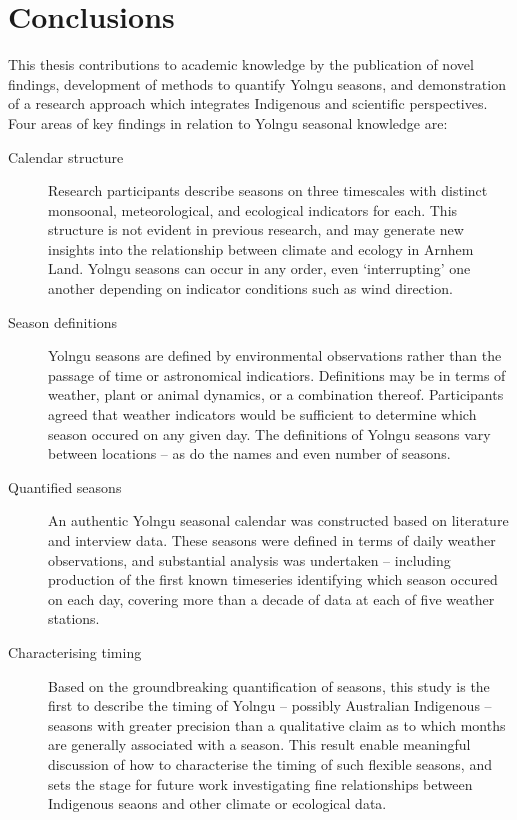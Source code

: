 \chapter{Conclusions}
\label{ch:conclusion}

This thesis contributions to academic knowledge by the publication of novel
findings, development of methods to quantify Yolngu seasons, and demonstration
of a research approach which integrates Indigenous and scientific perspectives.
%
Four areas of key findings in relation to Yolngu seasonal knowledge are:

\begin{description}
\item[Calendar structure]
    Research participants describe seasons on three timescales with distinct
    monsoonal, meteorological, and ecological indicators for each.  This
    structure is not evident in previous research, and may generate new
    insights into the relationship between climate and ecology in Arnhem Land.
    Yolngu seasons can occur in any order, even `interrupting' one another
    depending on indicator conditions such as wind direction.

\item[Season definitions]
    Yolngu seasons are defined by environmental observations rather than the
    passage of time or astronomical indicatiors.  Definitions may be in terms
    of weather, plant or animal dynamics, or a combination thereof.
    Participants agreed that weather indicators would be sufficient to
    determine which season occured on any given day.  The definitions of
    Yolngu seasons vary between locations -- as do the names and even number
    of seasons.

\item[Quantified seasons]
    An authentic Yolngu seasonal calendar was constructed based on literature
    and interview data.  These seasons were defined in terms of daily weather
    observations, and substantial analysis was undertaken -- including
    production of the first known timeseries identifying which season occured
    on each day, covering more than a decade of data at each of five weather
    stations.

\item[Characterising timing]
    Based on the groundbreaking quantification of seasons, this study is the
    first to describe the timing of Yolngu -- possibly Australian Indigenous --
    seasons with greater precision than a qualitative claim as to which months
    are generally associated with a season.  This result enable meaningful
    discussion of how to characterise the timing of such flexible seasons,
    and sets the stage for future work investigating fine relationships between
    Indigenous seaons and other climate or ecological data.
\end{description}


